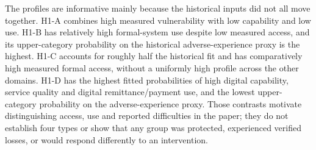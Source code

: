 The profiles are informative mainly because the historical inputs did not all move together. H1-A combines high measured vulnerability with low capability and low use. H1-B has relatively high formal-system use despite low measured access, and its upper-category probability on the historical adverse-experience proxy is the highest. H1-C accounts for roughly half the historical fit and has comparatively high measured formal access, without a uniformly high profile across the other domains. H1-D has the highest fitted probabilities of high digital capability, service quality and digital remittance/payment use, and the lowest upper-category probability on the adverse-experience proxy. Those contrasts motivate distinguishing access, use and reported difficulties in the paper; they do not establish four types or show that any group was protected, experienced verified losses, or would respond differently to an intervention.
